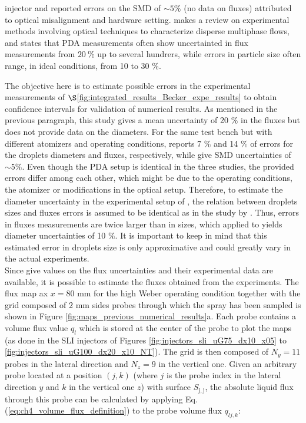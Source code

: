injector and reported errors on the SMD of $\sim 5 \%$ (no data on fluxes) attributed to optical misalignment and hardware setting.  makes a review on experimental methods involving optical techniques to characterize disperse multiphase flows, and states that PDA measurements often show uncertainted in flux measurements from $20~\%$ up to several hundrers, while errors in particle size often range, in ideal conditions, from 10 to 30 $\%$. 

The objective here is to estimate possible errors in the experimental measurements of $\S$\ref{fig:integrated_results_Becker_expe_results} to obtain confidence intervals for validation of numerical results. As mentioned in the previous paragraph, this study gives a mean uncertainty of 20 $\%$ in the fluxes but does not provide data on the diameters. For the same test bench but with different atomizers and operating conditions,  reports 7 $\%$ and 14 $\%$ of errors for the droplets diameters and fluxes, respectively, while  give SMD uncertainties of $\sim 5 \%$. Even though the PDA setup is identical in the three studies, the provided errors differ among each other, which might be due to the operating conditions, the atomizer or modifications in the optical setup. Therefore, to estimate the diameter uncertainty in the experimental setup of , the relation between droplets sizes and fluxes errors is assumed to be identical as in the study by . Thus, errors in fluxes measurements are twice larger than in sizes, which applied to  yields diameter uncertainties of 10 $\%$. It is important to keep in mind that this estimated error in droplets size is only approximative and could greatly vary in the actual experiments. \\ %

Since  give values on the flux uncertainties and their experimental data are available, it is possible to estimate the fluxes obtained from the experiments. The flux map ax $x = 80$ mm for the high Weber operating condition together with the grid composed of 2 mm sides probes through which the spray has been sampled is shown in Figure \ref{fig:maps_previous_numerical_results}a. Each probe contains a volume flux value $q_l$ which is stored at the center of the probe to plot the maps (as done in the SLI injectors of Figures 
\ref{fig:injectors_sli_uG75_dx10_x05} to \ref{fig:injectors_sli_uG100_dx20_x10_NT}). The grid is then composed of $N_y = 11$ probes in the lateral direction and $N_z = 9$ in the vertical one. Given an arbitrary probe located at a position $\left( j,k \right)$ (where $j$ is the probe index in the lateral direction $y$ and $k$ in the vertical one $z$) with surface $S_\mathrm{j,j}$, the absolute liquid flux through this probe can be calculated by applying Eq. (\ref{eq:ch4_volume_flux_definition}) to the probe volume flux $q_{l{j,k}}$:

